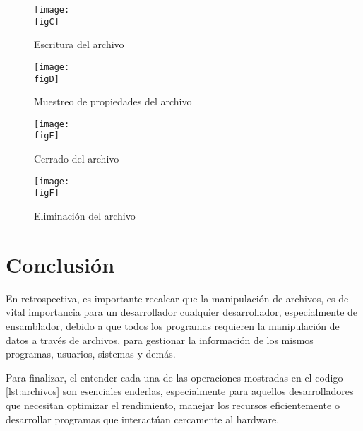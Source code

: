 	\begin{figure}[h]
		\centering
		\texttt{[image: \\figC]}
		\caption{Escritura del archivo}
	\end{figure}

	\begin{figure}[h]
		\centering
		\texttt{[image: \\figD]}
		\caption{Muestreo de propiedades del archivo}
	\end{figure}

	\begin{figure}[h]
		\centering
		\texttt{[image: \\figE]}
		\caption{Cerrado del archivo}
	\end{figure}

	\begin{figure}[h]
		\centering
		\texttt{[image: \\figF]}
		\caption{Eliminación del archivo}
	\end{figure}

	\clearpage
	\section{Conclusión}

	En retrospectiva, es importante recalcar que la manipulación de archivos, es
	de vital importancia para un desarrollador cualquier desarrollador, especialmente
	de ensamblador, debido a que todos los programas requieren la manipulación de
	datos a través de archivos, para gestionar la información de los mismos programas,
	usuarios, sistemas y demás.

	Para finalizar, el entender cada una de las operaciones mostradas en el codigo
	\ref{lst:archivos} son esenciales enderlas, especialmente para aquellos desarrolladores
	que necesitan optimizar el rendimiento, manejar los recursos eficientemente o
	desarrollar programas que interactúan cercamente al hardware.

